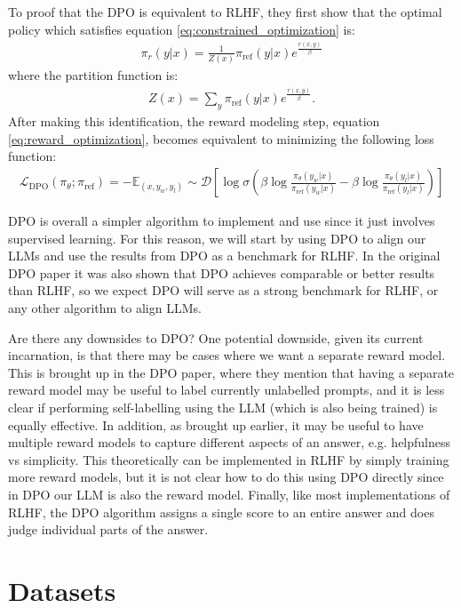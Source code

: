\documentclass[11pt, oneside]{article}   	%
\begin{document}
To proof that the DPO is equivalent to RLHF, they first show that the optimal policy which satisfies equation \ref{eq:constrained_optimization} is:
\begin{align}
\pi_{r}(y|x)=\frac{1}{Z(x)}\pi_{\text{ref}}(y|x)e^{\frac{r(x,y)}{\beta}}
\end{align} 
where the partition function is:
\begin{align}
Z(x)=\sum\limits_{y}\pi_{\text{ref}}(y|x)e^{\frac{r(x,y)}{\beta}}.
\end{align}
After making this identification, the reward modeling step, equation \ref{eq:reward_optimization}, becomes equivalent to minimizing the following loss function:
\begin{align}
\mathcal{L}_{\text{DPO}}(\pi_{\theta};\pi_{\text{ref}}) = -\mathbb{E}_{(x,y_w,y_l)}\sim\mathcal{D}\left[\log \sigma \left(\beta \log \frac{\pi_{\theta}(y_w|x)}{\pi_{\text{ref}}(y_w|x)}-\beta \log \frac{\pi_{\theta}(y_l|x)}{\pi_{\text{ref}}(y_l|x)}\right)\right]
\end{align}

DPO is overall a simpler algorithm to implement and use since it just involves supervised learning.
For this reason, we will start by using DPO to align our LLMs and use the results from DPO as a benchmark for RLHF. 
In the original DPO paper it was also shown that DPO achieves comparable or better results than RLHF, so we expect DPO will serve as a strong benchmark for RLHF, or any other algorithm to align LLMs. 

Are there any downsides to DPO?
One potential downside, given its current incarnation, is that there may be cases where we want a separate reward model.
This is brought up in the DPO paper, where they mention that having a separate reward model may be useful to label currently unlabelled prompts, and it is less clear if performing self-labelling using the LLM (which is also being trained) is equally effective.
In addition, as brought up earlier, it may be useful to have multiple reward models to capture different aspects of an answer, e.g. helpfulness vs simplicity. 
This theoretically can be implemented in RLHF by simply training more reward models, but it is not clear how to do this using DPO directly since in DPO our LLM is also the reward model.
Finally, like most implementations of RLHF, the DPO algorithm assigns a single score to an entire answer and does judge individual parts of the answer.

\section{Datasets}
\end{document}
